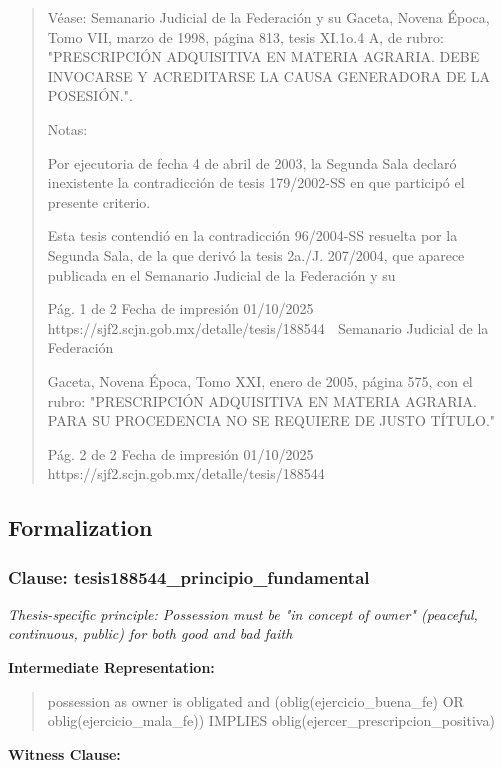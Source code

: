 \documentclass[11pt,a4paper]{article}
\begin{document}
\begin{quote}
Véase: Semanario Judicial de la Federación y su Gaceta, Novena Época, Tomo VII, marzo de 1998,
página 813, tesis XI.1o.4 A, de rubro: "PRESCRIPCIÓN ADQUISITIVA EN MATERIA AGRARIA.
DEBE INVOCARSE Y ACREDITARSE LA CAUSA GENERADORA DE LA POSESIÓN.".

Notas:

Por ejecutoria de fecha 4 de abril de 2003, la Segunda Sala declaró inexistente la contradicción de
tesis 179/2002-SS en que participó el presente criterio.

Esta tesis contendió en la contradicción 96/2004-SS resuelta por la Segunda Sala, de la que derivó
la tesis 2a./J. 207/2004, que aparece publicada en el Semanario Judicial de la Federación y su


                                             Pág. 1 de 2            Fecha de impresión 01/10/2025
  https://sjf2.scjn.gob.mx/detalle/tesis/188544
                                                  Semanario Judicial de la Federación

Gaceta, Novena Época, Tomo XXI, enero de 2005, página 575, con el rubro: "PRESCRIPCIÓN
ADQUISITIVA EN MATERIA AGRARIA. PARA SU PROCEDENCIA NO SE REQUIERE DE JUSTO
TÍTULO."




                                             Pág. 2 de 2       Fecha de impresión 01/10/2025
  https://sjf2.scjn.gob.mx/detalle/tesis/188544

\end{quote}

\subsection{Formalization}

\subsubsection{Clause: tesis188544\_principio\_fundamental}

\textit{Thesis-specific principle: Possession must be "in concept of owner" (peaceful, continuous, public) for both good and bad faith}

\textbf{Intermediate Representation:}

\begin{quote}
possession as owner is obligated and (oblig(ejercicio\_buena\_fe) OR oblig(ejercicio\_mala\_fe)) IMPLIES oblig(ejercer\_prescripcion\_positiva)
\end{quote}

\textbf{Witness Clause:}
\end{document}
